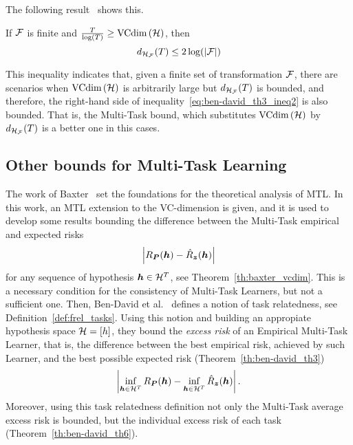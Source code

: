 The following result~\cite[Theorem~6]{Ben-DavidB08} shows this.
\begin{theorem}\label{th:ben-david_th6}
    If $\mathcal{F}$ is finite and $\frac{T}{\log (T)} \geq \text{VCdim}\left(\mathcal{H}\right)$, then
    \begin{equation}
        \nonumber
        d_{\mathcal{H}_{\mathcal{F}}}(T) \leq 2 \log(\left|\mathcal{F}\right|)
    \end{equation}
\end{theorem}
This inequality indicates that, given a finite set of transformation $\mathcal{F}$, there are scenarios when $\text{VCdim}\left(\mathcal{H}\right)$ is arbitrarily large but $d_{\mathcal{H}_{\mathcal{F}}}(T)$ is bounded, and therefore, the right-hand side of inequality~\eqref{eq:ben-david_th3_ineq2} is also bounded. That is, the Multi-Task bound, which substitutes $\text{VCdim}\left(\mathcal{H}\right)$ by $d_{\mathcal{H}_{\mathcal{F}}}(T)$ is a better one in this cases. 



\subsection{Other bounds for Multi-Task Learning}
The work of Baxter~\cite{baxter2000model} set the foundations for the theoretical analysis of MTL. 
In this work, an MTL extension to the VC-dimension is given, and it is used to develop some results bounding the difference between the Multi-Task empirical and expected risks 
\begin{equation}
    \nonumber
    \left|R_{\bm{P}}(\bm{h}) - \hat{R}_{\bm{z}}(\bm{h})\right|
\end{equation}
for any sequence of hypothesis $\bm{h} \in \mathcal{H}^T$, see Theorem~\ref{th:baxter_vcdim}. This is a necessary condition for the consistency of Multi-Task Learners, but not a sufficient one.
Then, Ben-David et al.~\cite{Ben-DavidS03,Ben-DavidB08} defines a notion of task relatedness, see Definition~\ref{def:frel_tasks}. Using this notion and building an appropiate hypothesis space $\mathcal{H} = \lbrack h\rbrack$, they bound the \emph{excess risk} of an Empirical Multi-Task Learner, that is, the difference between the best empirical risk, achieved by such Learner, and the best possible expected risk (Theorem~\ref{th:ben-david_th3})
\begin{equation}
    \nonumber
    \left|\inf_{\bm{h} \in \mathcal{H}^T} R_{\bm{P}}(\bm{h}) - \inf_{\bm{h} \in \mathcal{H}^T} \hat{R}_{\bm{z}}(\bm{h})\right| .
\end{equation}
Moreover, using this task relatedness definition not only the Multi-Task average excess risk is bounded, but the individual excess risk of each task (Theorem~\ref{th:ben-david_th6}).

